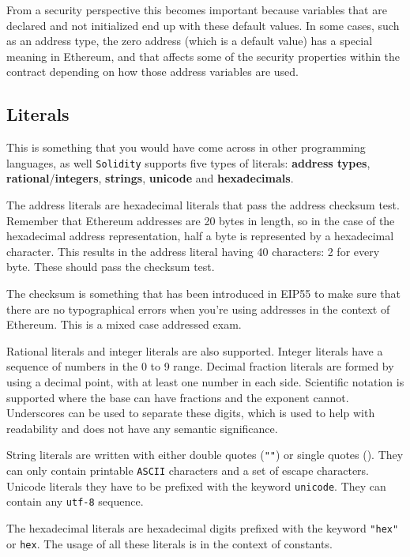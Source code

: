 From a security perspective this becomes important because variables
that are declared and not initialized end up with these default values.
In some cases, such as an address type, the zero address (which is a
default value) has a special meaning in Ethereum, and that affects some
of the security properties within the contract depending on how those
address variables are used.

\subsection{Literals}\label{literals}

This is something that you would have come across in other programming
languages, as well \texttt{Solidity} supports five types of literals:
\textbf{address types}, \textbf{rational}/\textbf{integers},
\textbf{strings}, \textbf{unicode} and \textbf{hexadecimals}.

The address literals are hexadecimal literals that pass the address
checksum test. Remember that Ethereum addresses are 20 bytes in length,
so in the case of the hexadecimal address representation, half a byte is
represented by a hexadecimal character. This results in the address
literal having 40 characters: 2 for every byte. These should pass the
checksum test.

The checksum is something that has been introduced in EIP55 to make sure
that there are no typographical errors when you're using addresses in
the context of Ethereum. This is a mixed case addressed exam.

Rational literals and integer literals are also supported. Integer
literals have a sequence of numbers in the 0 to 9 range. Decimal
fraction literals are formed by using a decimal point, with at least one
number in each side. Scientific notation is supported where the base can
have fractions and the exponent cannot. Underscores can be used to
separate these digits, which is used to help with readability and does
not have any semantic significance.

String literals are written with either double quotes (\texttt{""}) or
single quotes (\texttt{\textquotesingle{}\textquotesingle{}}). They can
only contain printable \texttt{ASCII} characters and a set of escape
characters. Unicode literals they have to be prefixed with the keyword
\texttt{unicode}. They can contain any \texttt{utf-8} sequence.

The hexadecimal literals are hexadecimal digits prefixed with the
keyword \texttt{"hex"} or
\texttt{\textquotesingle{}hex\textquotesingle{}}. The usage of all these
literals is in the context of constants.

